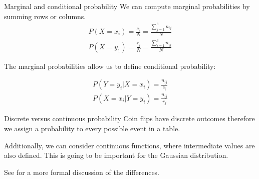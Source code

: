 \documentclass[notes]{beamer}
\begin{document}
  \begin{frame}{Marginal and conditional probability}
    We can compute marginal probabilities by summing rows or columns.
    \begin{align}
      P(X = x_i) = \frac{c_i}{N} = \frac{ \sum_{j=1}^{3} n_{ij}}{N} \\
      P(X = y_1) = \frac{r_j}{N} = \frac{ \sum_{i=1}^{3} n_{ij}}{N}
    \end{align}
    
    The marginal probabilities allow us to define conditional probability:
    
    \begin{align}
      P(Y = y_i | X = x_i) = \frac{n_{ij}}{c_i} \\
      P(X = x_i | Y = y_i) = \frac{n_{ij}}{r_j}
    \end{align}

    \end{frame}

    \begin{frame}{Discrete versus continuous probability}
      Coin flips have discrete outcomes therefore we assign a probability
      to every possible event in a table.

      Additionally, we can consider continuous functions, where intermediate values
      are also defined. This is going to be important for the Gaussian distribution.

      See \cite{deisenroth2020mathematics} for a more formal discussion of the differences.
    \end{frame}
\end{document}
